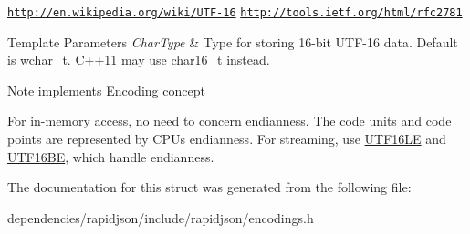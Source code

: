 \href{http://en.wikipedia.org/wiki/UTF-16}{\tt http\+://en.\+wikipedia.\+org/wiki/\+U\+T\+F-\/16} \href{http://tools.ietf.org/html/rfc2781}{\tt http\+://tools.\+ietf.\+org/html/rfc2781} 
\begin{DoxyTemplParams}{Template Parameters}
{\em Char\+Type} & Type for storing 16-\/bit U\+T\+F-\/16 data. Default is wchar\+\_\+t. C++11 may use char16\+\_\+t instead. \\
\hline
\end{DoxyTemplParams}
\begin{DoxyNote}{Note}
implements Encoding concept

For in-\/memory access, no need to concern endianness. The code units and code points are represented by C\+PU\textquotesingle{}s endianness. For streaming, use \hyperlink{struct_u_t_f16_l_e}{U\+T\+F16\+LE} and \hyperlink{struct_u_t_f16_b_e}{U\+T\+F16\+BE}, which handle endianness. 
\end{DoxyNote}


The documentation for this struct was generated from the following file\+:\begin{DoxyCompactItemize}
\item 
dependencies/rapidjson/include/rapidjson/encodings.\+h\end{DoxyCompactItemize}
